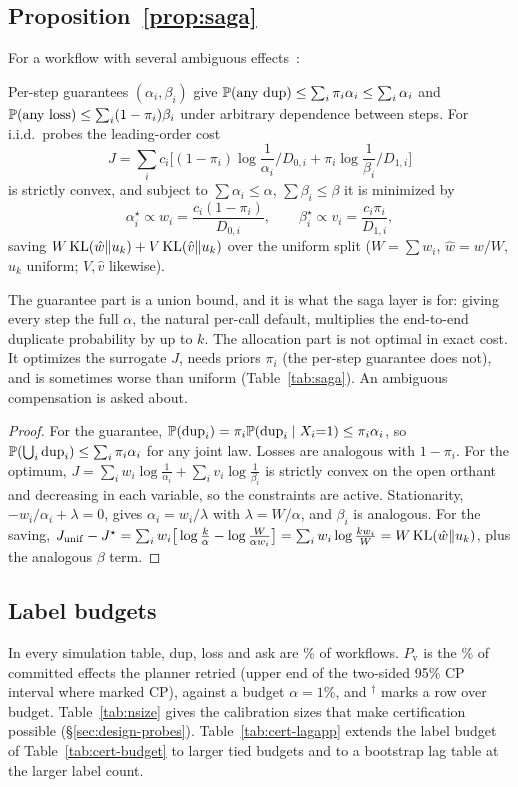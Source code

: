 \subsection{Proposition~\ref{prop:saga}}
For a workflow with several ambiguous effects~\cite{garciamolina1987sagas,chang2025sagallm}:
\begin{proposition}
\label{prop:saga}
Per-step guarantees $(\alpha_i,\beta_i)$ give $\mathbb{P}(\text{any dup})\le\sum_i\pi_i\alpha_i\le\sum_i\alpha_i$ and $\mathbb{P}(\text{any loss})\le\sum_i(1-\pi_i)\beta_i$ under arbitrary dependence
between steps. For i.i.d.\ probes the leading-order cost
\[
J=\textstyle\sum_i c_i\big[(1-\pi_i)\log\frac{1}{\alpha_i}/D_{0,i}+\pi_i\log\frac{1}{\beta_i}/D_{1,i}\big]
\]
is strictly convex, and subject to $\sum\alpha_i\le\alpha$, $\sum\beta_i\le\beta$ it is minimized by
\begin{equation}
\alpha_i^\star\propto w_i=\frac{c_i(1-\pi_i)}{D_{0,i}},\qquad \beta_i^\star\propto v_i=\frac{c_i\pi_i}{D_{1,i}},
\label{eq:kkt}
\end{equation}
saving $W\,\mathrm{KL}(\hat w\|u_k)+V\,\mathrm{KL}(\hat v\|u_k)$ over the uniform split ($W=\sum w_i$, $\hat w=w/W$, $u_k$ uniform; $V,\hat v$ likewise).
\end{proposition}
The guarantee part is a union bound, and it is what the saga layer is for: giving every step the full $\alpha$, the natural per-call default, multiplies the end-to-end
duplicate probability by up to $k$. The allocation part is not optimal in exact cost. It optimizes the surrogate $J$, needs priors $\pi_i$ (the per-step guarantee does not),
and is sometimes worse than uniform (Table~\ref{tab:saga}). An ambiguous compensation is asked about.

\begin{proof}
For the guarantee, $\mathbb{P}(\mathrm{dup}_i)=\pi_i\mathbb{P}(\mathrm{dup}_i\mid X_i{=}1)\le\pi_i\alpha_i$, so $\mathbb{P}(\bigcup_i\mathrm{dup}_i)\le\sum_i\pi_i\alpha_i$ for any joint law. Losses are analogous with $1-\pi_i$.
For the optimum, $J=\sum_iw_i\log\frac1{\alpha_i}+\sum_iv_i\log\frac1{\beta_i}$ is strictly convex on the open orthant and decreasing in each variable, so the constraints are active.
Stationarity, $-w_i/\alpha_i+\lambda=0$, gives $\alpha_i=w_i/\lambda$ with $\lambda=W/\alpha$, and $\beta_i$ is analogous.
For the saving, $J_{\mathrm{unif}}-J^\star=\sum_iw_i\big[\log\frac k\alpha-\log\frac{W}{\alpha w_i}\big]=\sum_iw_i\log\frac{kw_i}{W}=W\,\mathrm{KL}(\hat w\|u_k)$, plus the analogous $\beta$ term.
\end{proof}

\subsection{Label budgets}
\label{app:labels}
In every simulation table, dup, loss and ask are \% of workflows.
$P_{\mathrm v}$ is the \% of committed effects the planner retried (upper end of the two-sided 95\% CP interval where marked CP), against a budget $\alpha{=}1\%$, and $^\dagger$ marks a row over budget.
Table~\ref{tab:nsize} gives the calibration sizes that make certification possible (\S\ref{sec:design-probes}). Table~\ref{tab:cert-lagapp} extends the label budget of
Table~\ref{tab:cert-budget} to larger tied budgets and to a bootstrap lag table at the larger label count.

